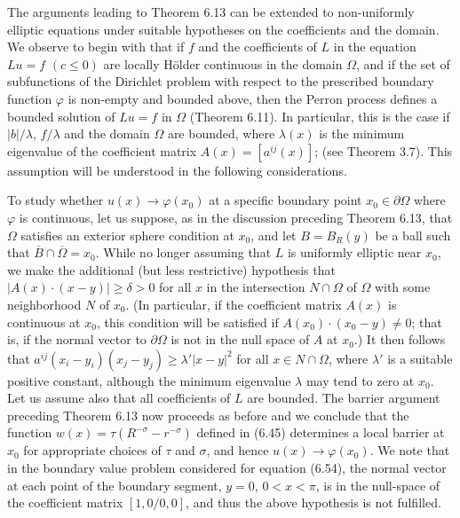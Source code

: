 The arguments leading to Theorem 6.13 can be extended to non-uniformly elliptic equations under suitable hypotheses on the coefficients and the domain. We observe to begin with that if $f$ and the coefficients of $L$ in the equation $Lu=f$ $(c\le 0)$ are locally H\"older continuous in the domain $\Omega$, and if the set of subfunctions of the Dirichlet problem with respect to the prescribed boundary function $\varphi$ is non-empty and bounded above, then the Perron process defines a bounded solution of $Lu=f$ in $\Omega$ (Theorem 6.11). In particular, this is the case if $\lvert b\rvert/\lambda$, $f/\lambda$ and the domain $\Omega$ are bounded, where $\lambda(x)$ is the minimum eigenvalue of the coefficient matrix $A(x)=[a^{ij}(x)]$; (see Theorem 3.7). This assumption will be understood in the following considerations.

To study whether $u(x)\to \varphi(x_0)$ at a specific boundary point $x_0\in\partial\Omega$ where $\varphi$ is continuous, let us suppose, as in the discussion preceding Theorem 6.13, that $\Omega$ satisfies an exterior sphere condition at $x_0$, and let $B=B_R(y)$ be a ball such that $\overline{B}\cap\overline{\Omega}=x_0$. While no longer assuming that $L$ is uniformly elliptic near $x_0$, we make the additional (but less restrictive) hypothesis that $\lvert A(x)\cdot(x-y)\rvert\ge \delta>0$ for all $x$ in the intersection $N\cap\Omega$ of $\Omega$ with some neighborhood $N$ of $x_0$. (In particular, if the coefficient matrix $A(x)$ is continuous at $x_0$, this condition will be satisfied if $A(x_0)\cdot(x_0-y)\ne 0$; that is, if the normal vector to $\partial\Omega$ is not in the null space of $A$ at $x_0$.) It then follows that $a^{ij}(x_i-y_i)(x_j-y_j)\ge \lambda' \lvert x-y\rvert^2$ for all $x\in N\cap\Omega$, where $\lambda'$ is a suitable positive constant, although the minimum eigenvalue $\lambda$ may tend to zero at $x_0$. Let us assume also that all coefficients of $L$ are bounded. The barrier argument preceding Theorem 6.13 now proceeds as before and we conclude that the function $w(x)=\tau(R^{-\sigma}-r^{-\sigma})$ defined in (6.45) determines a local barrier at $x_0$ for appropriate choices of $\tau$ and $\sigma$, and hence $u(x)\to\varphi(x_0)$. We note that in the boundary value problem considered for equation (6.54), the normal vector at each point of the boundary segment, $y=0$, $0<x<\pi$, is in the null-space of the coefficient matrix $[1,0/0,0]$, and thus the above hypothesis is not fulfilled.

